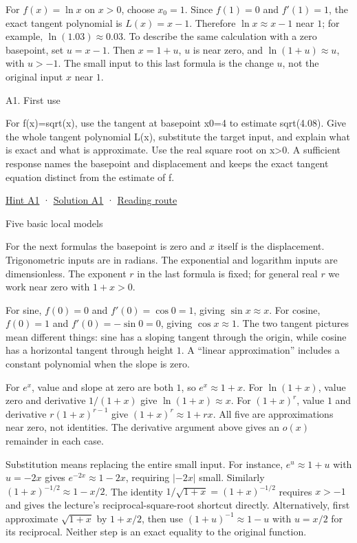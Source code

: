 \documentclass[
  11pt,
]{article}
\providecommand{\gt}{>}
\begin{document}
For \(f(x)=\ln x\) on \(x\gt 0\), choose \(x_0=1\). Since \(f(1)=0\) and
\(f'(1)=1\), the exact tangent polynomial is \(L(x)=x-1\). Therefore
\(\ln x\approx x-1\) near \(1\); for example, \(\ln(1.03)\approx0.03\).
To describe the same calculation with a zero basepoint, set \(u=x-1\).
Then \(x=1+u\), \(u\) is near zero, and \(\ln(1+u)\approx u\), with
\(u\gt -1\). The small input to this last formula is the change \(u\),
not the original input \(x\) near \(1\).

A1. First use

For f(x)=sqrt(x), use the tangent at basepoint x0=4 to estimate
sqrt(4.08). Give the whole tangent polynomial L(x), substitute the
target input, and explain what is exact and what is approximate. Use the
real square root on x\textgreater0. A sufficient response names the
basepoint and displacement and keeps the exact tangent equation distinct
from the estimate of f.

\protect\hyperlink{h1}{Hint A1} · \protect\hyperlink{s1}{Solution A1} ·
\protect\hyperlink{route}{Reading route}

Five basic local models

For the next formulas the basepoint is zero and \(x\) itself is the
displacement. Trigonometric inputs are in radians. The exponential and
logarithm inputs are dimensionless. The exponent \(r\) in the last
formula is fixed; for general real \(r\) we work near zero with
\(1+x\gt 0\).

For sine, \(f(0)=0\) and \(f'(0)=\cos0=1\), giving \(\sin x\approx x\).
For cosine, \(f(0)=1\) and \(f'(0)=-\sin0=0\), giving
\(\cos x\approx1\). The two tangent pictures mean different things: sine
has a sloping tangent through the origin, while cosine has a horizontal
tangent through height \(1\). A ``linear approximation'' includes a
constant polynomial when the slope is zero.

For \(e^x\), value and slope at zero are both \(1\), so
\(e^x\approx1+x\). For \(\ln(1+x)\), value zero and derivative
\(1/(1+x)\) give \(\ln(1+x)\approx x\). For \((1+x)^r\), value \(1\) and
derivative \(r(1+x)^{r-1}\) give \((1+x)^r\approx1+rx\). All five are
approximations near zero, not identities. The derivative argument above
gives an \(o(x)\) remainder in each case.

Substitution means replacing the entire small input. For instance,
\(e^u\approx1+u\) with \(u=-2x\) gives \(e^{-2x}\approx1-2x\), requiring
\(|-2x|\) small. Similarly \((1+x)^{-1/2}\approx1-x/2\). The identity
\(1/\sqrt{1+x}=(1+x)^{-1/2}\) requires \(x\gt -1\) and gives the
lecture's reciprocal-square-root shortcut directly. Alternatively, first
approximate \(\sqrt{1+x}\) by \(1+x/2\), then use
\((1+u)^{-1}\approx1-u\) with \(u=x/2\) for its reciprocal. Neither step
is an exact equality to the original function.
\end{document}
